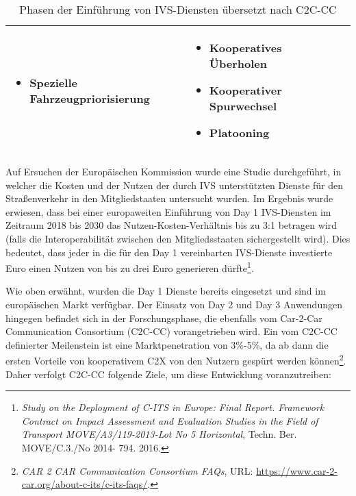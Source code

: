 \begin{table}[h!]
\begin{tabular}{|m{4em}|m{10em}|m{10em}|m{8em}|}
\begin{itemize}[leftmargin=0.3cm]
	\item Spezielle Fahrzeugpriorisierung
	
	\end{itemize} & 
	\begin{itemize}[leftmargin=0.3cm] \item Kooperatives Überholen
	
	\item Kooperativer Spurwechsel
	
	\item Platooning\footnotemark
	
	\end{itemize} \\ 
		\hline
	\end{tabular}
	\caption[Phasen der Einführung von IVS-Diensten \nocite{Car2Car}]{Phasen der Einführung von IVS-Diensten übersetzt nach C2C-CC \footnotemark}
	\label{table:1}
\end{table}


\nocite{Car2Car}

Auf Ersuchen der Europäischen Kommission wurde eine Studie durchgeführt, in welcher die Kosten und der Nutzen der durch IVS unterstützten Dienste für den Straßenverkehr in den Mitgliedstaaten untersucht wurden. Im Ergebnis wurde erwiesen, dass bei einer europaweiten Einführung von Day 1 IVS-Diensten im Zeitraum 2018 bis 2030 das Nutzen-Kosten-Verhältnis bis zu 3:1 betragen wird (falls die Interoperabilität zwischen den Mitgliedsstaaten sichergestellt wird). Dies bedeutet, dass jeder in die für den Day 1 vereinbarten IVS-Dienste investierte Euro einen Nutzen von bis zu drei Euro generieren dürfte\footnote{\emph{Study on the Deployment of C-ITS in Europe: Final Report. Framework Contract on Impact Assessment and Evaluation Studies in the Field of Transport MOVE/A3/119-2013-Lot No 5 Horizontal}, Techn. Ber. MOVE/C.3./No 2014- 794. 2016.}. \nocite{StudyDeployment} 

Wie oben erwähnt, wurden die Day 1 Dienste bereits eingesetzt und sind im europäischen Markt verfügbar. Der Einsatz von Day 2 und Day 3 Anwendungen hingegen befindet sich in der Forschungsphase, die ebenfalls vom Car-2-Car Communication Consortium (C2C-CC) vorangetrieben wird. Ein vom C2C-CC definierter Meilenstein ist eine Marktpenetration von 3\%-5\%, da ab dann die ersten Vorteile von kooperativem C2X von den Nutzern gespürt werden können\footnote{\emph{CAR 2 CAR Communication Consortium FAQs}, URL: \url{https://www.car-2-car.org/about-c-its/c-its-faqs/}.}\nocite{Car2Car}. Daher verfolgt C2C-CC folgende Ziele, um diese Entwicklung voranzutreiben:

